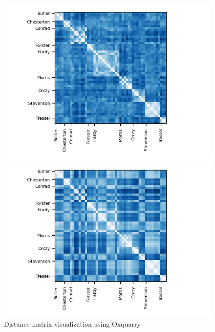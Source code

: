 \begin{figure}[!t]
  \caption{Distance matrix visualization using Oxquarry}
  \label{fig:distances_matrix_oxquarry}

  \label{fig:distance_matrix_oxquarry_clark}
  \includegraphics{img/distance_matrix_oxquarry_clark.png}

  \vspace{0.5cm}

  \label{fig:distance_matrix_oxquarry_tanimoto}
  \includegraphics{img/distance_matrix_oxquarry_tanimoto.png}
\end{figure}

